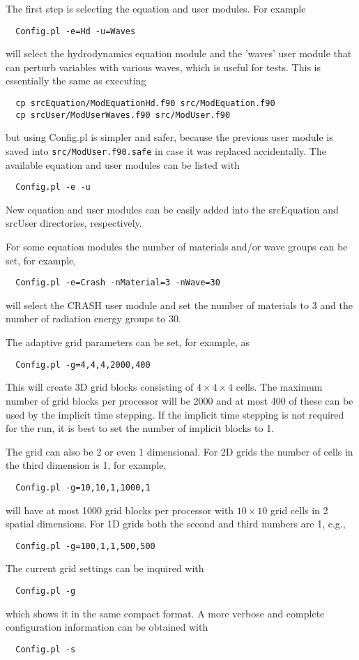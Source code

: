 The first step is selecting the equation and user modules. For example 
\begin{verbatim}
  Config.pl -e=Hd -u=Waves
\end{verbatim}
will select the hydrodynamics equation module and the 'waves' user module
that can perturb variables with various waves, which is useful for tests.
This is essentially the same as executing
\begin{verbatim}
  cp srcEquation/ModEquationHd.f90 src/ModEquation.f90
  cp srcUser/ModUserWaves.f90 src/ModUser.f90
\end{verbatim}
but using Config.pl is simpler and safer, because the previous user module
is saved into {\tt src/ModUser.f90.safe} in case it was replaced accidentally.
The available equation and user modules can be listed with
\begin{verbatim}
  Config.pl -e -u
\end{verbatim}
New equation and user modules can be easily added into the srcEquation and srcUser
directories, respectively.

For some equation modules the number of materials and/or wave groups can be set, 
for example, 
\begin{verbatim}
  Config.pl -e=Crash -nMaterial=3 -nWave=30
\end{verbatim}
will select the CRASH user module and set the number of materials to 3 and the 
number of radiation energy groups to 30.

The adaptive grid parameters can be set, for example, as
\begin{verbatim}
  Config.pl -g=4,4,4,2000,400
\end{verbatim}
This will create 3D grid blocks consisting of $4\times 4\times 4$ cells.
The maximum number of grid blocks per processor will be 2000 and at most 
400 of these can be used by the implicit time stepping. If the implicit
time stepping is not required for the run, it is best to set the number
of implicit blocks to 1. 

The grid can also be 2 or even 1 dimensional. For 2D grids the number
of cells in the third dimension is 1, for example,
\begin{verbatim}
  Config.pl -g=10,10,1,1000,1
\end{verbatim}
will have at most 1000 grid blocks per processor with $10\times 10$ grid cells
in 2 spatial dimensions. For 1D grids both the second and third numbers are 1, 
e.g., 
\begin{verbatim}
  Config.pl -g=100,1,1,500,500
\end{verbatim}
The current grid settings can be inquired with
\begin{verbatim}
  Config.pl -g
\end{verbatim}
which shows it in the same compact format. A more verbose and complete
configuration information can be obtained with
\begin{verbatim}
  Config.pl -s
\end{verbatim}

